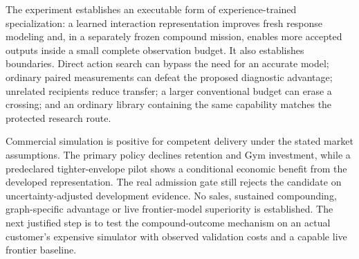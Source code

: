 The experiment establishes an executable form of experience-trained specialization: a learned interaction representation improves fresh response modeling and, in a separately frozen compound mission, enables more accepted outputs inside a small complete observation budget. It also establishes boundaries. Direct action search can bypass the need for an accurate model; ordinary paired measurements can defeat the proposed diagnostic advantage; unrelated recipients reduce transfer; a larger conventional budget can erase a crossing; and an ordinary library containing the same capability matches the protected research route.\par Commercial simulation is positive for competent delivery under the stated market assumptions. The primary policy declines retention and Gym investment, while a predeclared tighter-envelope pilot shows a conditional economic benefit from the developed representation. The real admission gate still rejects the candidate on uncertainty-adjusted development evidence. No sales, sustained compounding, graph-specific advantage or live frontier-model superiority is established. The next justified step is to test the compound-outcome mechanism on an actual customer's expensive simulator with observed validation costs and a capable live frontier baseline.
